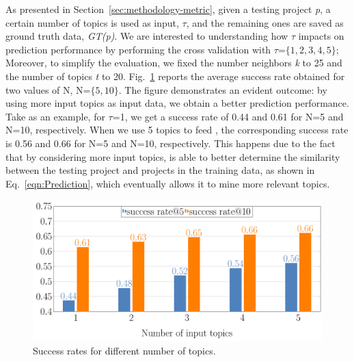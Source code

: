 As presented in Section~\ref{sec:methodology-metric}, given a testing project \emph{p}, a certain number of topics is used as input, \ie $\tau$, and the remaining ones are saved as ground truth data, \ie \emph{GT(p)}. We are interested to understanding how $\tau$ impacts on prediction performance by performing the cross validation with $\tau$=$\{1,2,3,4,5\}$; Moreover, to simplify the evaluation, we fixed the number neighbors \emph{k} to 25 and the number of topics \emph{t} to 20. Fig.~\ref{fig:pr-input-topics} reports the average success rate obtained for two values of N, \ie N=$\{5,10\}$. %
The figure demonstrates an evident outcome: by using more input topics as input data, we obtain a better prediction performance. Take as an example, for $\tau$=1, we get a success rate of 0.44 and 0.61 for N=5 and N=10, respectively. When we use 5 topics to feed \TFa, the corresponding success rate is 0.56 and 0.66 for N=5 and N=10, respectively. This happens due to the fact that by considering more input topics, \TFa is able to better determine the similarity between the testing project and projects in the training data, as shown in Eq.~\ref{eqn:Prediction}, which eventually allows it to mine more relevant topics.

\begin{figure}[t!]
	\centering
	\includegraphics[width=0.8\linewidth]{figs/successRate_inputTopic.pdf}
	\caption{Success rates for different number of topics.}
	\label{fig:pr-input-topics}
\end{figure} 

